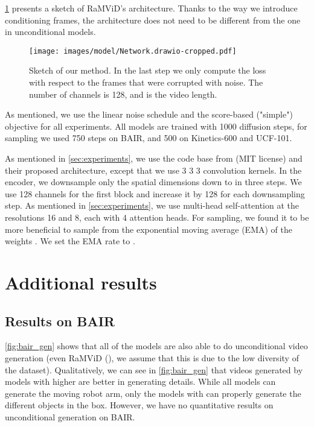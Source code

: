 \documentclass[10pt]{article} \usepackage[accepted]{tmlr}
\begin{document}
\cref{fig:model} presents a sketch of RaMViD's architecture. Thanks to the way we introduce conditioning frames, the architecture does not need to be different from the one in unconditional models.

\begin{figure}[bh]
    \centering
    \texttt{[image: images/model/Network.drawio-cropped.pdf]}
    \caption{Sketch of our method. In the last step we only compute the loss with respect to the frames that were corrupted with noise. The number of channels  is 128, and  is the video length.}
    \label{fig:model}
\end{figure}


As mentioned, we use the linear noise schedule and the score-based ("simple") objective for all experiments. All models are trained with 1000 diffusion steps, for sampling we used 750 steps on BAIR, and 500 on Kinetics-600 and UCF-101. 

As mentioned in \cref{sec:experiments}, we use the code base from \citet{pmlr-v139-nichol21a} (MIT license) and their proposed architecture, except that we use 3  3  3 convolution kernels.
In the encoder, we downsample only the spatial dimensions down to  in three steps. We use 128 channels for the first block and increase it by 128 for each downsampling step. As mentioned in \cref{sec:experiments}, we use multi-head self-attention at the resolutions 16 and 8, each with 4 attention heads. For sampling, we found it to be more beneficial to sample from the exponential moving average (EMA) of the weights \citep{pmlr-v139-nichol21a}. We set the EMA rate to .


\section{Additional results}

\subsection{Results on BAIR}
\label{sec:extra_on_bair}
\cref{fig:bair_gen} shows that all of the models are also able to do unconditional video generation (even RaMViD (), we assume that this is due to the low diversity of the dataset). Qualitatively, we can see in \cref{fig:bair_gen} that videos generated by models with higher  are better in generating details. While all models can generate the moving robot arm, only the models with  can properly generate the different objects in the box. However, we have no quantitative results on unconditional generation on BAIR.
\end{document}
